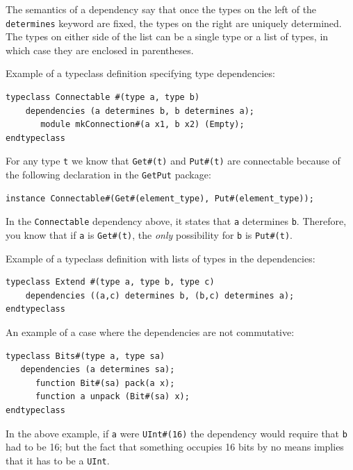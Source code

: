 \documentclass[twoside,letterpaper]{article}
\newcommand{\te}[1]{\texttt{#1}}
\begin{document}
The
semantics of a dependency say that once the types on the left of the
\te{determines} keyword are fixed, the types on the right are 
uniquely  determined.  The types on either side of the list can be a
single type or a list of types, in which case they are enclosed in
parentheses.

Example of a typeclass definition specifying type dependencies:
\begin{verbatim}
typeclass Connectable #(type a, type b)
    dependencies (a determines b, b determines a);
       module mkConnection#(a x1, b x2) (Empty);
endtypeclass
\end{verbatim}

For any type \texttt{t} we know that \texttt{Get\#(t)}
and \texttt{Put\#(t)} are connectable because of the following
declaration in the \te{GetPut} package: 
\begin{verbatim}
instance Connectable#(Get#(element_type), Put#(element_type));
\end{verbatim}

In the \te{Connectable} dependency above, it states that \te{a}
determines \te{b}.  Therefore, you know
that if \te{a} is \te{Get\#(t)}, the \emph{only} possibility for \te{b} is
 \te{Put\#(t)}.



Example of a typeclass definition with lists of types in the dependencies:
\begin{verbatim}
typeclass Extend #(type a, type b, type c)
    dependencies ((a,c) determines b, (b,c) determines a); 
endtypeclass
\end{verbatim}


An example of a case where the dependencies are not commutative:
\begin{verbatim}
typeclass Bits#(type a, type sa)
   dependencies (a determines sa);
      function Bit#(sa) pack(a x);
      function a unpack (Bit#(sa) x);
endtypeclass
\end{verbatim}
In the above example, if \te{a} were \te{UInt\#(16)} the dependency
would require that \te{b} had to be 16; but the fact that something
occupies 16 bits by no means implies that it has to be a \te{UInt}.


\end{document}
